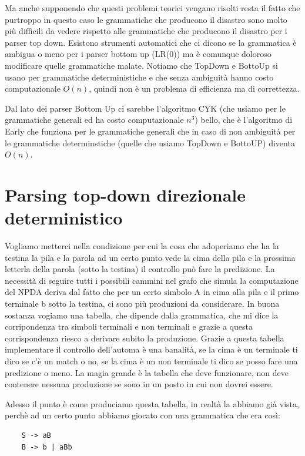 Ma anche supponendo che questi problemi teorici vengano risolti resta il fatto che purtroppo in questo caso le grammatiche che producono il disastro sono molto più difficili da vedere rispetto alle grammatiche che producono il disastro per i parser top down. Esistono strumenti automatici che ci dicono se la grammatica è ambigua o meno per i parser bottom up (LR(0)) ma è comunque doloroso modificare quelle grammatiche malate. Notiamo che TopDown e BottoUp si usano per grammatiche deterministiche e che senza ambiguità hanno costo computazionale $O(n)$, quindi non è un problema di efficienza ma di correttezza. 

Dal lato dei parser Bottom Up ci sarebbe l'algoritmo CYK (che usiamo per le grammatiche generali ed ha costo computazionale $n^3$) bello, che è l'algoritmo di Early che funziona per le grammatiche generali che in caso di non ambiguità per le grammatiche determinstiche (quelle che usiamo TopDown e BottoUP) diventa $O(n)$.

\section{Parsing top-down direzionale deterministico}

Vogliamo metterci nella condizione per cui la cosa che adoperiamo che ha la testina la pila e la parola ad un certo punto vede la cima della pila e la prossima letterla della parola (sotto la testina) il controllo può fare la predizione.
La necessità di seguire tutti i possibili cammini nel grafo che simula la computazione del NPDA deriva dal fatto che per un certo simbolo A in cima alla pila e il primo terminale b sotto la testina, ci sono più produzioni da considerare.
In buona sostanza vogiamo una tabella, che dipende dalla grammatica, che mi dice la corripondenza tra simboli terminali e non terminali e grazie a questa corrispondenza riesco a derivare subito la produzione. Grazie a questa tabella implementare il controllo dell'automa è una banalità, se la cima è un terminale ti dico se c'è un match o no, se la cima è un non terminale ti dico se posso fare una predizione o meno. La magia grande è la tabella che deve funzionare, non deve contenere nessuna produzione se sono in un posto in cui non dovrei essere.

Adesso il punto è come produciamo questa tabella, in realtà la abbiamo già vista, perchè ad un certo punto abbiamo giocato con una grammatica che era così:
\begin{lstlisting}
    S -> aB
    B -> b | aBb
\end{lstlisting}

